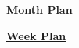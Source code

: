 \documentclass[11pt]{article}
\begin{document}
\underline{\huge{\textbf{Month Plan}}} \\

\newpage


\underline{\huge{\textbf{Week Plan}}} \\
%
\newpage


%
%

%
%

\end{document}
